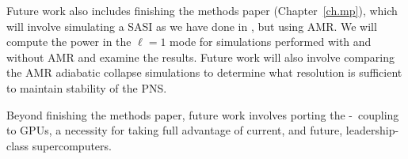Future work also includes finishing the methods paper (Chapter~\ref{ch.mp}),
which will involve
simulating a SASI as we have done in \citet{dem2023}, but using AMR.
We will compute the power in the $\ell=1$ mode for simulations performed
with and without AMR and examine the results.
Future work will also involve comparing the AMR adiabatic collapse simulations
to determine what resolution is sufficient to maintain stability of the PNS.

Beyond finishing the methods paper, future work involves porting the
\thornado-\amrex\ coupling to GPUs,
a necessity for taking full advantage of current, and future,
leadership-class supercomputers.
